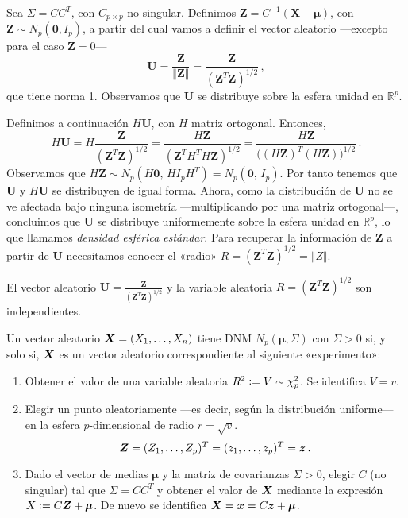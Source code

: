 Sea $\Sigma = CC^T$, con $C_{p\times p}$ no singular. Definimos $\boldsymbol Z = C^{-1}(\boldsymbol X - \boldsymbol \mu)$, con $\boldsymbol Z \sim N_p(\boldsymbol 0, I_p)$, a partir del cual vamos a definir el vector aleatorio —excepto para el caso $\boldsymbol Z = 0$— \[\boldsymbol U = \frac{\boldsymbol Z}{\Vert \boldsymbol Z \Vert} = \frac{\boldsymbol Z}{(\boldsymbol Z^T \boldsymbol Z)^{1/2}}\,,\] que tiene norma 1. Observamos que $\boldsymbol U$ se distribuye sobre la esfera unidad en $\mathbb R^p$.

Definimos a continuación $H \boldsymbol U$, con $H$ matriz ortogonal. Entonces, \[
  H \boldsymbol U = H \frac{\boldsymbol Z}{\left(\boldsymbol Z^T \boldsymbol Z\right)^{1/2}} = \frac{H\boldsymbol Z}{\left(\boldsymbol Z^T H^T H\boldsymbol Z\right)^{1/2}} = \frac{H\boldsymbol Z}{\Big((H\boldsymbol Z)^T (H\boldsymbol Z)\Big)^{1/2}}\,.
\] Observamos que $H \boldsymbol Z \sim N_p(H \boldsymbol 0,\, H I_pH^T) = N_p(\boldsymbol 0,\, I_p)$. Por tanto tenemos que $\boldsymbol U$ y $H \boldsymbol U$ se distribuyen de igual forma. Ahora, como la distribución de $\boldsymbol U$ no se ve afectada bajo ninguna isometría —multiplicando por una matriz ortogonal—, concluimos que $\boldsymbol U$ se distribuye uniformemente sobre la esfera unidad en $\mathbb R^p$, lo que llamamos \textit{densidad esférica estándar}. Para recuperar la información de $\boldsymbol Z$ a partir de $\boldsymbol U$ necesitamos conocer el «radio» $R = (\boldsymbol Z^T \boldsymbol Z)^{1/2} = \Vert Z \Vert$.

\begin{nprop}
  El vector aleatorio $\boldsymbol U = \frac{\boldsymbol Z}{(\boldsymbol Z^T \boldsymbol Z)^{1/2}}$ y la variable aleatoria $R = (\boldsymbol Z^T \boldsymbol Z)^{1/2}$ son independientes.
\end{nprop}


\begin{nprop}
  Un vector aleatorio $\boldsymbol{X} = (X_1, \dots, X_n)$ tiene DNM $N_p(\boldsymbol \mu, \Sigma)$ con $\Sigma > 0$ si, y solo si, $\boldsymbol{X}$ es un vector aleatorio correspondiente al siguiente «experimento»:

  \begin{enumerate}
    \item Obtener el valor de una variable aleatoria $R^2 \vcentcolon= V \sim \chi_p^2$. Se identifica $V = v$.
    \item Elegir un punto aleatoriamente —es decir, según la distribución uniforme— en la esfera $p$-dimensional de radio $r = \sqrt{v}$. \[\boldsymbol{Z} = (Z_1, \dots, Z_p)^T = (z_1, \dots, z_p)^T = \boldsymbol z\,.\]
    \item Dado el vector de medias $\boldsymbol \mu$ y la matriz de covarianzas $\Sigma > 0$, elegir $C$ (no singular) tal que $\Sigma = CC^T$ y obtener el valor de $\boldsymbol{X}$ mediante la expresión $X\vcentcolon= C\boldsymbol{Z} + \boldsymbol \mu$. De nuevo se identifica $\boldsymbol{X} = \boldsymbol x = C\boldsymbol z + \boldsymbol \mu$.
  \end{enumerate}
\end{nprop}

